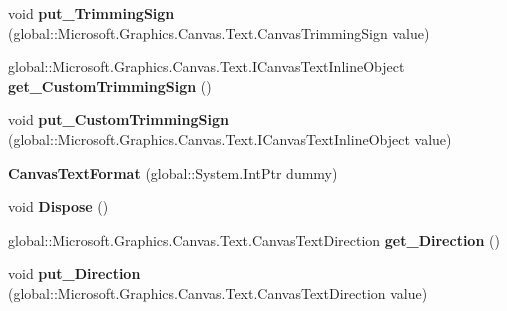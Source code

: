 \begin{DoxyCompactItemize}
void {\bfseries put\+\_\+\+Trimming\+Sign} (global\+::\+Microsoft.\+Graphics.\+Canvas.\+Text.\+Canvas\+Trimming\+Sign value)
\item 
\mbox{\label{class_microsoft_1_1_graphics_1_1_canvas_1_1_text_1_1_canvas_text_format_a50e09efee298194e2e557308c2a13012}} 
global\+::\+Microsoft.\+Graphics.\+Canvas.\+Text.\+I\+Canvas\+Text\+Inline\+Object {\bfseries get\+\_\+\+Custom\+Trimming\+Sign} ()
\item 
\mbox{\label{class_microsoft_1_1_graphics_1_1_canvas_1_1_text_1_1_canvas_text_format_a28ea164db75b0d1e4f012001370dc6f8}} 
void {\bfseries put\+\_\+\+Custom\+Trimming\+Sign} (global\+::\+Microsoft.\+Graphics.\+Canvas.\+Text.\+I\+Canvas\+Text\+Inline\+Object value)
\item 
\mbox{\label{class_microsoft_1_1_graphics_1_1_canvas_1_1_text_1_1_canvas_text_format_a8cbafb823def969fc2ed24c98d5016f7}} 
{\bfseries Canvas\+Text\+Format} (global\+::\+System.\+Int\+Ptr dummy)
\item 
\mbox{\label{class_microsoft_1_1_graphics_1_1_canvas_1_1_text_1_1_canvas_text_format_a174c6d766e1732425a63a7ee7ca6a9bb}} 
void {\bfseries Dispose} ()
\item 
\mbox{\label{class_microsoft_1_1_graphics_1_1_canvas_1_1_text_1_1_canvas_text_format_a47023dedd64cd980189d5fc8fe614629}} 
global\+::\+Microsoft.\+Graphics.\+Canvas.\+Text.\+Canvas\+Text\+Direction {\bfseries get\+\_\+\+Direction} ()
\item 
\mbox{\label{class_microsoft_1_1_graphics_1_1_canvas_1_1_text_1_1_canvas_text_format_a345d3dff62bda0ba2440e40e7a5abbc6}} 
void {\bfseries put\+\_\+\+Direction} (global\+::\+Microsoft.\+Graphics.\+Canvas.\+Text.\+Canvas\+Text\+Direction value)
\item 
\mbox{\label{class_microsoft_1_1_graphics_1_1_canvas_1_1_text_1_1_canvas_text_format_a49be7f6687260bafd4e46d160d645c7c}} 

\end{DoxyCompactItemize}
